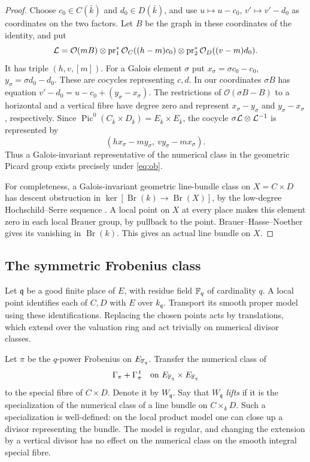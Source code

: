 \documentclass[11pt]{article}
\newcommand{\Pic}{\operatorname{Pic}}\newcommand{\Sel}{\operatorname{Sel}}\newcommand{\End}{\operatorname{End}}\newcommand{\NS}{\operatorname{NS}}
\begin{document}
\begin{proof}
Choose $c_0\in C(\bar k)$ and $d_0\in D(\bar k)$, and use
$u\mapsto u-c_0$, $v'\mapsto v'-d_0$ as coordinates on the two factors.
Let $B$ be the graph in these coordinates of the identity, and put
\[
 {\cal L}=\mathcal O(mB)\otimes
       \operatorname{pr}_1^*\mathcal O_C((h-m)c_0)
          \otimes\operatorname{pr}_2^*\mathcal O_D((v-m)d_0).
\]
It has triple $(h,v,[m])$. For a Galois element $\sigma$ put
$x_\sigma=\sigma c_0-c_0$, $y_\sigma=\sigma d_0-d_0$. These are
cocycles representing $c,d$. In our coordinates $\sigma B$ has
equation $v'-d_0=u-c_0+(y_\sigma-x_\sigma)$. The restrictions of
$\mathcal O(\sigma B-B)$ to a horizontal and a vertical fibre have
degree zero and represent $x_\sigma-y_\sigma$ and
$y_\sigma-x_\sigma$, respectively. Since
$\Pic^0(C_{\bar k}\times D_{\bar k})=E_{\bar k}\times E_{\bar k}$,
the cocycle $\sigma{\cal L}\otimes{\cal L}^{-1}$ is represented by
\[
      (h x_\sigma-m y_\sigma,\ v y_\sigma-m x_\sigma).
\]
Thus a Galois-invariant representative of the numerical class in the
geometric Picard group exists precisely under \eqref{eq:ob}.

For completeness, a Galois-invariant geometric line-bundle class on
$X=C\times D$ has descent obstruction in
$\ker[\operatorname{Br}(k)\to\operatorname{Br}(X)]$, by the low-degree
Hochschild--Serre sequence \cite[Chap.~4]{CTS}. A local point on $X$
at every place makes this element zero in each local Brauer group, by
pullback to the point. Brauer--Hasse--Noether gives its vanishing in
$\operatorname{Br}(k)$. This gives an actual line bundle on $X$.
\end{proof}

\subsection{The symmetric Frobenius class}

Let $\mathfrak q$ be a good finite place of $E$, with residue field
$\mathbb F_q$ of cardinality $q$. A local point identifies each of $C,D$
with $E$ over $k_{\mathfrak q}$. Transport its smooth proper model
using these identifications. Replacing the chosen points acts by
translations, which extend over the valuation ring and act trivially
on numerical divisor classes.

Let $\pi$ be the $q$-power Frobenius on $E_{\mathbb F_q}$. Transfer the
numerical class of
\[
             \Gamma_\pi+\Gamma_\pi^{\,t}
             \quad\text{on }E_{\mathbb F_q}\times E_{\mathbb F_q}
\]
to the special fibre of $C\times D$. Denote it by $W_{\mathfrak q}$.
Say that $W_{\mathfrak q}$ \emph{lifts} if it is the specialization
of the numerical class of a line bundle on $C\times_k D$.
Such a specialization is well-defined: on the local product model
one can close up a divisor representing the bundle. The model is
regular, and changing the extension by a vertical divisor has no
effect on the numerical class on the smooth integral special fibre.
\end{document}
